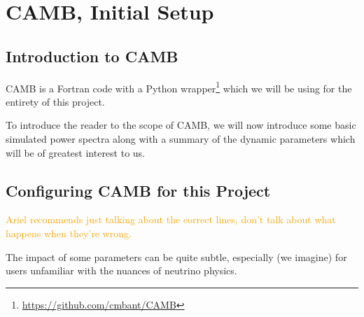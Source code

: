 \chapter{CAMB, Initial Setup}

\section{Introduction to CAMB}

CAMB is a Fortran code with a Python wrapper\footnote{
\url{https://github.com/cmbant/CAMB}
} which we will be using for the
entirety of this project.

To introduce the reader to the scope of CAMB, we will now introduce
some basic simulated power spectra along with a summary of the dynamic
parameters which will be of greatest interest to us.

\section{Configuring CAMB for this Project}

\begin{comment}
\textcolor{blue}{
I hope to, in painstaking detail, cover many of the lines of the code that I
have written to interface with CAMB. I will include plots to indicate, at
every step, what incorrect settings cause the power spectrum to look like (or,
for subtler errors, what the error curves looked like compared to Ariel's
results, which I treated as a sort of ``ground truth''). This should also be a
good example to flex my physics interpretation skills: why does this incorrect
setting produce this undesired pattern?}

\textcolor{blue}{You might think that this is sort of an inappropriate 
section
for a master's thesis (especially since I have in mind that this be a lengthy 
section), but I would like to include it unless you feel very strongly. After 
all, I spent several months of the project debugging at least ten different 
ways that slight and major errors in the various settings led to 
irreconcilable results.}
\end{comment}

\textcolor{orange}{Ariel recommends
just talking about the correct lines, don't talk about what happens when
they're wrong.}

The impact of some parameters can be quite subtle, especially (we imagine)
for users unfamiliar with the nuances of neutrino physics.

